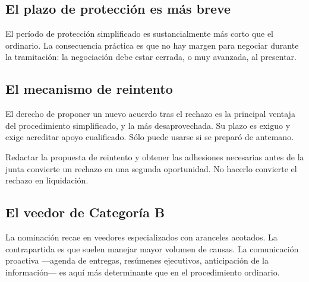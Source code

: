 \bloqueFocos

\subsection{El plazo de protección es más breve}

El período de protección simplificado es sustancialmente más corto que el ordinario. La
consecuencia práctica es que no hay margen para negociar durante la tramitación: la
negociación debe estar cerrada, o muy avanzada, al presentar.

\subsection{El mecanismo de reintento}

El derecho de proponer un nuevo acuerdo tras el rechazo es la principal ventaja del
procedimiento simplificado, y la más desaprovechada. Su plazo es exiguo y exige acreditar
apoyo cualificado. Sólo puede usarse si se preparó de antemano.

\begin{foco}
Redactar la propuesta de reintento y obtener las adhesiones necesarias antes de la junta
convierte un rechazo en una segunda oportunidad. No hacerlo convierte el rechazo en
liquidación.
\end{foco}

\subsection{El veedor de Categoría B}

La nominación recae en veedores especializados con aranceles acotados. La contrapartida
es que suelen manejar mayor volumen de causas. La comunicación proactiva ---agenda de
entregas, resúmenes ejecutivos, anticipación de la información--- es aquí más
determinante que en el procedimiento ordinario.

\bloqueCronograma

